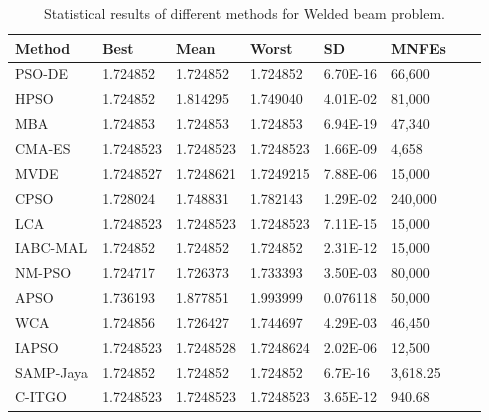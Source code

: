 
\begin{table*}[tp]
    \tiny
\begin{center}

\begin{tabular}{ P{2.0cm} P{2.0cm} P{2.0cm} P{2.0cm} P{2.0cm} P{2.0cm} P{2.0cm} P{2.0cm}  }
\hline
\textbf{Method} & \textbf{Best} & \textbf{Mean} & \textbf{Worst} & \textbf{SD} & \textbf{MNFEs} \\
\hline
PSO-DE & 1.724852 & 1.724852 & 1.724852 & 6.70E-16 & 66,600 \\
HPSO & 1.724852 & 1.814295 & 1.749040 & 4.01E-02 & 81,000 \\
MBA & 1.724853 & 1.724853 & 1.724853 & 6.94E-19 & 47,340 \\
CMA-ES & 1.7248523 & 1.7248523 & 1.7248523 & 1.66E-09 & 4,658 \\
MVDE & 1.7248527 & 1.7248621 & 1.7249215 & 7.88E-06 & 15,000 \\
CPSO & 1.728024 & 1.748831 & 1.782143 & 1.29E-02 & 240,000 \\
LCA & 1.7248523 & 1.7248523 & 1.7248523 & 7.11E-15 & 15,000 \\
IABC-MAL & 1.724852 & 1.724852 & 1.724852 & 2.31E-12 & 15,000 \\
NM-PSO & 1.724717 & 1.726373 & 1.733393 & 3.50E-03 & 80,000 \\
APSO & 1.736193 & 1.877851 & 1.993999 & 0.076118 & 50,000 \\
WCA & 1.724856 & 1.726427 & 1.744697 & 4.29E-03 & 46,450 \\
IAPSO & 1.7248523 & 1.7248528 & 1.7248624 & 2.02E-06 & 12,500 \\
SAMP-Jaya & 1.724852 & 1.724852 & 1.724852 & 6.7E-16 & 3,618.25 \\
C-ITGO & 1.7248523 & 1.7248523 & 1.7248523 & 3.65E-12 & 940.68 \\


\hline
\end{tabular}
\end{center}

\caption{ Statistical results of different methods for Welded beam problem. \\[1em]}
\label{tab:WB}
\end{table*}

